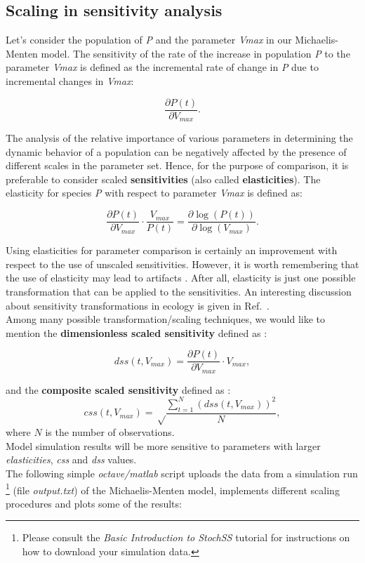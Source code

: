 \subsection{Scaling in sensitivity analysis}
Let's consider the population of \textit{P} and the parameter \textit{Vmax} in our Michaelis-Menten model. The sensitivity of the rate of the increase in population \textit{P} to the parameter \textit{Vmax} is defined as the incremental rate of change in \textit{P} due to incremental changes in \textit{Vmax}:

\begin{equation}
\frac{\partial P(t)}{\partial V_{max}}.
\end{equation}

The analysis of the relative importance of various parameters in determining the dynamic behavior of a population can be negatively affected by the presence of different scales in the parameter set. Hence, for the purpose of comparison, it is preferable to consider scaled \textbf{sensitivities} (also called \textbf{elasticities}). The elasticity for species \textit{P} with respect to parameter \textit{Vmax} is defined as:

\begin{equation}
\frac{\partial P(t)}{\partial V_{max}} \cdot \frac{V_{max}}{P(t)} = \frac{\partial \log(P(t))}{\partial\log(V_{max})}.
\end{equation}

Using elasticities for parameter comparison is certainly an improvement with respect to the use of unscaled sensitivities. However, it is worth remembering that the use of elasticity may lead to artifacts \cite{scale}. After all, elasticity is just one possible transformation that can be applied to the sensitivities. An interesting discussion about sensitivity transformations in ecology is given in Ref.~\cite{scale}. \\
Among many possible transformation/scaling techniques, we would like to mention the \textbf{dimensionless scaled sensitivity} defined as \cite{calib}:

\begin{equation}
dss(t, V_{max}) = \frac{\partial P(t)}{\partial V_{max}} \cdot V_{max},
\end{equation}

and the \textbf{composite scaled sensitivity} defined as \cite{calib}:
\begin{equation}
css(t,V_{max}) = \sqrt \frac{\sum_{t=1}^N \left(dss(t,V_{max})\right)^2}{N},
\end{equation}
where $N$ is the number of observations.\\
Model simulation results will be more sensitive to parameters with larger \textit{elasticities}, \textit{css} and \textit{dss} values.\\
The following simple \textit{octave/matlab} script uploads the data from a simulation run  \footnote{Please consult the \textit{Basic Introduction to StochSS} tutorial for instructions on how to download your simulation data.} (file \textit{output.txt}) of the Michaelis-Menten model, implements different scaling procedures and plots some of the results:

